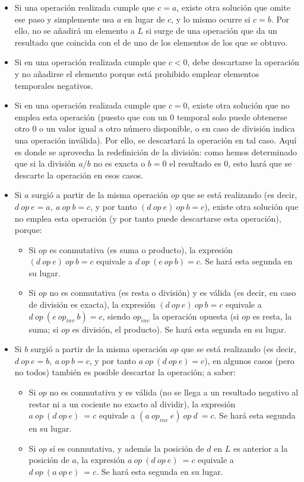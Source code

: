 \documentclass{article}
\begin{document}
\begin{itemize}
	\item Si una operación realizada cumple que $c=a$, existe otra solución que omite ese paso y simplemente usa $a$ en lugar de $c$, y lo mismo ocurre si $c=b$. Por ello, no se añadirá un elemento a $L$ si surge de una operación que da un resultado que coincida con el de uno de los elementos de los que se obtuvo.
	\item Si en una operación realizada cumple que $c < 0$, debe descartarse la operación y no añadirse el elemento porque está prohibido emplear elementos temporales negativos.
	\item Si en una operación realizada cumple que $c = 0$, existe otra solución que no emplea esta operación (puesto que con un $0$ temporal solo puede obtenerse otro $0$ o un valor igual a otro número disponible, o en caso de división indica una operación inválida). Por ello, se descartará la operación en tal caso. Aquí es donde se aprovecha la redefinición de la división: como hemos determinado que si la división $a/b$ no es exacta o $b=0$ el resultado es $0$, esto hará que se descarte la operación en esos casos.
	\item Si $a$ surgió a partir de la misma operación $op$ que se está realizando (es decir, $d\ op\ e = a,\ a\ op\ b = c$, y por tanto $(d\ op\ e)\ op\ b = c$), existe otra solución que no emplea esta operación (y por tanto puede descartarse esta operación), porque:
	\begin{itemize}
		\item Si $op$ es conmutativa (es suma o producto), la expresión $(d\ op\ e)\ op\ b = c$ equivale a $d\ op\ (e\ op\ b) = c$. Se hará esta segunda en su lugar.
		\item Si $op$ no es conmutativa (es resta o división) y es válida (es decir, en caso de división es exacta), la expresión $(d\ op\ e)\ op\ b = c$ equivale a $d\ op\ (e\ op_{inv}\ b) = c$, siendo $op_{inv}$ la operación opuesta (si $op$ es resta, la suma; si $op$ es división, el producto). Se hará esta segunda en su lugar.
	\end{itemize}
	\item Si $b$ surgió a partir de la misma operación $op$ que se está realizando (es decir, $d\ op\ e = b,\ a\ op\ b = c$, y por tanto $a\ op\ (d\ op\ e) = c$), en algunos casos (pero no todos) también es posible descartar la operación; a saber:
	\begin{itemize}
		\item Si $op$ no es conmutativa y es válida (no se llega a un resultado negativo al restar ni a un cociente no exacto al dividir), la expresión $a\ op\ (d\ op\ e)\ = c$ equivale a $(a\ op_{inv}\ e)\ op\ d\ = c$. Se hará esta segunda en su lugar.
		\item Si $op$ sí es conmutativa, y además la posición de $d$ en $L$ es anterior a la posición de $a$, la expresión $a\ op\ (d\ op\ e)\ = c$ equivale a $d\ op\ (a\ op\ e)\ = c$. Se hará esta segunda en su lugar.
	\end{itemize}
\end{itemize}
\end{document}
